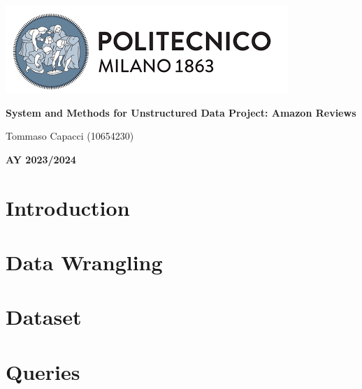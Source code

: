 \documentclass[table, 12pt]{article}
\begin{document}
\begin{titlepage}
    \centering
    \vfill
    \includegraphics[scale=0.9]{Images/PolimiLogo.png}\par\vspace{1cm}
    \vspace{1cm}
    {\huge\bfseries System and Methods for Unstructured Data Project: Amazon Reviews \par}
    \vspace{3cm}
    {\Large {Tommaso Capacci (10654230)}\par}
    \vfill
    {\large \textbf{AY 2023/2024}\par}
    \vfill
\end{titlepage}
\thispagestyle{plain}
\mbox{}
\newpage
{}
\tableofcontents
\newpage
{}

\clearpage
{{\section{Introduction}}}
\label{sect:introduction}

\clearpage
{{\section{Data Wrangling}}}
\label{sect:wrangling}

\clearpage
{{\section{Dataset}}}
\label{sect:dataset}

\clearpage
{{\section{Queries}}}
\label{sect:queries}

\end{document}
